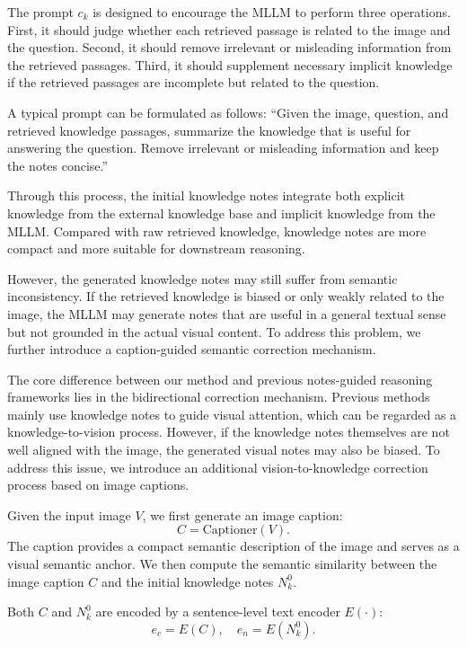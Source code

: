 \documentclass[manuscript,screen,review]{acmart}
\begin{document}
The prompt $c_k$ is designed to encourage the MLLM to perform three operations. First, it should judge whether each retrieved passage is related to the image and the question. Second, it should remove irrelevant or misleading information from the retrieved passages. Third, it should supplement necessary implicit knowledge if the retrieved passages are incomplete but related to the question.

A typical prompt can be formulated as follows: ``Given the image, question, and retrieved knowledge passages, summarize the knowledge that is useful for answering the question. Remove irrelevant or misleading information and keep the notes concise.''

Through this process, the initial knowledge notes integrate both explicit knowledge from the external knowledge base and implicit knowledge from the MLLM. Compared with raw retrieved knowledge, knowledge notes are more compact and more suitable for downstream reasoning.

However, the generated knowledge notes may still suffer from semantic inconsistency. If the retrieved knowledge is biased or only weakly related to the image, the MLLM may generate notes that are useful in a general textual sense but not grounded in the actual visual content. To address this problem, we further introduce a caption-guided semantic correction mechanism.

The core difference between our method and previous notes-guided reasoning frameworks lies in the bidirectional correction mechanism. Previous methods mainly use knowledge notes to guide visual attention, which can be regarded as a knowledge-to-vision process. However, if the knowledge notes themselves are not well aligned with the image, the generated visual notes may also be biased. To address this issue, we introduce an additional vision-to-knowledge correction process based on image captions.

Given the input image $V$, we first generate an image caption:
\begin{equation}
C = \text{Captioner}(V).
\end{equation}
The caption provides a compact semantic description of the image and serves as a visual semantic anchor. We then compute the semantic similarity between the image caption $C$ and the initial knowledge notes $N_k^{0}$.

Both $C$ and $N_k^{0}$ are encoded by a sentence-level text encoder $E(\cdot)$:
\begin{equation}
e_c = E(C), \quad e_n = E(N_k^{0}).
\end{equation}
\end{document}
